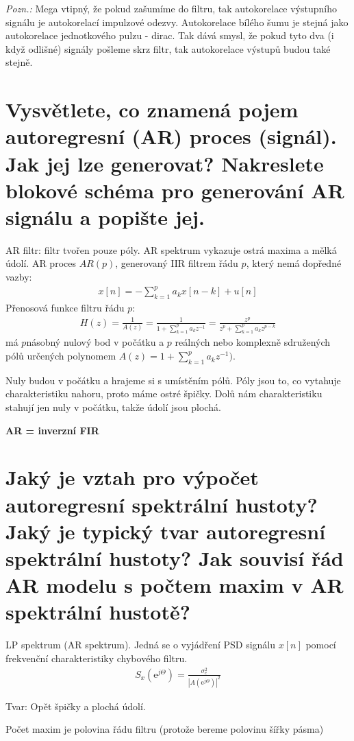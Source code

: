 \documentclass[a4paper,12pt]{article}   %
\newcommand{\mt}[1]{$#1$}
\newcommand{\ejt}{\text{e}^{j\Theta}}
\begin{document}
\textit{Pozn.:} Mega vtipný, že pokud zašumíme do filtru, tak autokorelace výstupního signálu je autokorelací impulzové odezvy. Autokorelace bílého šumu je stejná jako autokorelace jednotkového pulzu - dirac. Tak dává smysl, že pokud tyto dva (i když odlišné) signály pošleme skrz filtr, tak autokorelace výstupů budou také stejně.


\section{Vysvětlete, co znamená pojem autoregresní (AR) proces (signál). Jak jej lze generovat? Nakreslete blokové schéma pro generování AR signálu a popište jej.}
\label{sec:ar:intro}
AR filtr: filtr tvořen pouze póly. AR spektrum vykazuje ostrá maxima a mělká údolí. AR proces \mt{AR(p)}, generovaný IIR filtrem řádu \mt{p}, který nemá dopředné vazby:
\begin{align*}
        x[n]=-\sum_{k=1}^p a_k x[n-k] + u[n]
\end{align*}
Přenosová funkce filtru řádu \mt{p}:
\begin{align*}
        H(z) = \frac{1}{A(z)} = \frac{1}{1+\sum_{k=1}^p a_k z^{-1}} = \frac{z^p}{z^p + \sum_{k=1}^p a_k z^{p-k}}
\end{align*}
má \mt{p}násobný nulový bod v počátku a \mt{p} reálných nebo komplexně sdružených pólů určených polynomem \mt{A(z) = 1+\sum_{k=1}^p a_k z^{-1})}.

Nuly budou v počátku a hrajeme si s umístěním pólů. Póly jsou to, co vytahuje charakteristiku nahoru, proto máme ostré špičky. Dolů nám charakteristiku stahují jen nuly v počátku, takže údolí jsou plochá. 

\textbf{AR = inverzní FIR}


\section{Jaký je vztah pro výpočet autoregresní spektrální hustoty? Jaký je typický tvar autoregresní spektrální hustoty? Jak souvisí řád AR modelu s počtem maxim v AR spektrální hustotě?}

LP spektrum (AR spektrum). Jedná se o vyjádření PSD signálu \mt{x[n]} pomocí frekvenční charakteristiky chybového filtru. 
\begin{align*}
        S_x(\ejt) = \frac{\sigma^2_e}{|A(\ejt)|^2}
\end{align*}

Tvar: Opět špičky a plochá údolí.

Počet maxim je polovina řádu filtru (protože bereme polovinu šířky pásma) 
\end{document}
